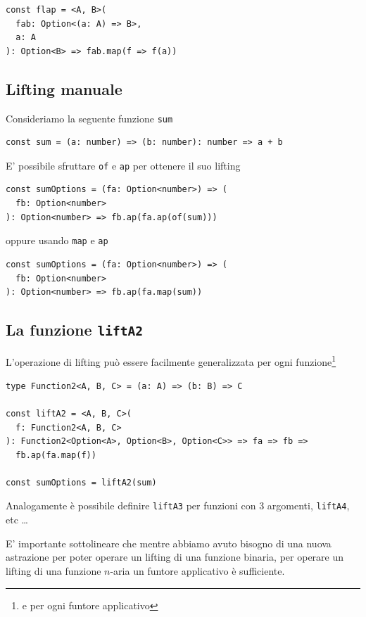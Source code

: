 \documentclass[12pt]{article}
\begin{document}
\begin{verbatim}
const flap = <A, B>(
  fab: Option<(a: A) => B>,
  a: A
): Option<B> => fab.map(f => f(a))
\end{verbatim}

\subsection{Lifting manuale}

Consideriamo la seguente funzione \texttt{sum}

\begin{verbatim}
const sum = (a: number) => (b: number): number => a + b
\end{verbatim}

E' possibile sfruttare \texttt{of} e \texttt{ap} per ottenere il suo lifting

\begin{verbatim}
const sumOptions = (fa: Option<number>) => (
  fb: Option<number>
): Option<number> => fb.ap(fa.ap(of(sum)))
\end{verbatim}

oppure usando \texttt{map} e \texttt{ap}

\begin{verbatim}
const sumOptions = (fa: Option<number>) => (
  fb: Option<number>
): Option<number> => fb.ap(fa.map(sum))
\end{verbatim}

\subsection{La funzione \texttt{liftA2}}

L'operazione di lifting può essere facilmente generalizzata per ogni funzione\footnote{e per ogni funtore applicativo}

\begin{verbatim}
type Function2<A, B, C> = (a: A) => (b: B) => C

const liftA2 = <A, B, C>(
  f: Function2<A, B, C>
): Function2<Option<A>, Option<B>, Option<C>> => fa => fb =>
  fb.ap(fa.map(f))

const sumOptions = liftA2(sum)
\end{verbatim}

Analogamente è possibile definire \texttt{liftA3} per funzioni con 3 argomenti, \texttt{liftA4}, etc \ldots

E' importante sottolineare che mentre abbiamo avuto bisogno di una nuova astrazione per poter operare un lifting di una funzione binaria,
per operare un lifting di una funzione $n$-aria un funtore applicativo è sufficiente.
\end{document}
